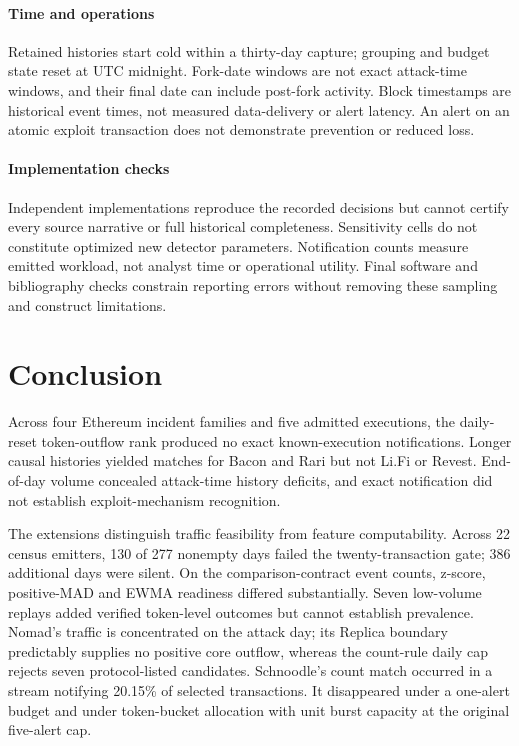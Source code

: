 \documentclass[preprint,12pt,authoryear]{elsarticle}
\begin{document}
\paragraph{Time and operations} Retained histories start cold within a thirty-day capture; grouping and budget state reset at UTC midnight. Fork-date windows are not exact attack-time windows, and their final date can include post-fork activity. Block timestamps are historical event times, not measured data-delivery or alert latency. An alert on an atomic exploit transaction does not demonstrate prevention or reduced loss.

\paragraph{Implementation checks} Independent implementations reproduce the recorded decisions but cannot certify every source narrative or full historical completeness. Sensitivity cells do not constitute optimized new detector parameters. Notification counts measure emitted workload, not analyst time or operational utility. Final software and bibliography checks constrain reporting errors without removing these sampling and construct limitations.

\section{Conclusion}\label{sec:conclusion}
Across four Ethereum incident families and five admitted executions, the daily-reset token-outflow rank produced no exact known-execution notifications. Longer causal histories yielded matches for Bacon and Rari but not Li.Fi or Revest. End-of-day volume concealed attack-time history deficits, and exact notification did not establish exploit-mechanism recognition.

The extensions distinguish traffic feasibility from feature computability. Across 22 census emitters, 130 of 277 nonempty days failed the twenty-transaction gate; 386 additional days were silent. On the comparison-contract event counts, z-score, positive-MAD and EWMA readiness differed substantially. Seven low-volume replays added verified token-level outcomes but cannot establish prevalence. Nomad's traffic is concentrated on the attack day; its Replica boundary predictably supplies no positive core outflow, whereas the count-rule daily cap rejects seven protocol-listed candidates. Schnoodle's count match occurred in a stream notifying 20.15\% of selected transactions. It disappeared under a one-alert budget and under token-bucket allocation with unit burst capacity at the original five-alert cap.
\end{document}
